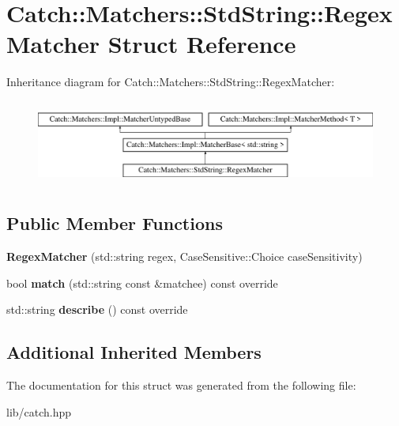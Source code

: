 \hypertarget{struct_catch_1_1_matchers_1_1_std_string_1_1_regex_matcher}{}\section{Catch\+:\+:Matchers\+:\+:Std\+String\+:\+:Regex\+Matcher Struct Reference}
\label{struct_catch_1_1_matchers_1_1_std_string_1_1_regex_matcher}
Inheritance diagram for Catch\+:\+:Matchers\+:\+:Std\+String\+:\+:Regex\+Matcher\+:\begin{figure}[H]
\begin{center}
\leavevmode
\includegraphics[height=2.818792cm]{struct_catch_1_1_matchers_1_1_std_string_1_1_regex_matcher}
\end{center}
\end{figure}
\subsection*{Public Member Functions}
\begin{DoxyCompactItemize}
\item 
\mbox{\label{struct_catch_1_1_matchers_1_1_std_string_1_1_regex_matcher_ab914deb885fe25558c41ab368c6b3916}} 
{\bfseries Regex\+Matcher} (std\+::string regex, Case\+Sensitive\+::\+Choice case\+Sensitivity)
\item 
\mbox{\label{struct_catch_1_1_matchers_1_1_std_string_1_1_regex_matcher_aa8e61adccabb2f36133029301f6b8f4e}} 
bool {\bfseries match} (std\+::string const \&matchee) const override
\item 
\mbox{\label{struct_catch_1_1_matchers_1_1_std_string_1_1_regex_matcher_a1f788cd5258c987e5043f6c7f43adeb9}} 
std\+::string {\bfseries describe} () const override
\end{DoxyCompactItemize}
\subsection*{Additional Inherited Members}


The documentation for this struct was generated from the following file\+:\begin{DoxyCompactItemize}
\item 
lib/catch.\+hpp\end{DoxyCompactItemize}
